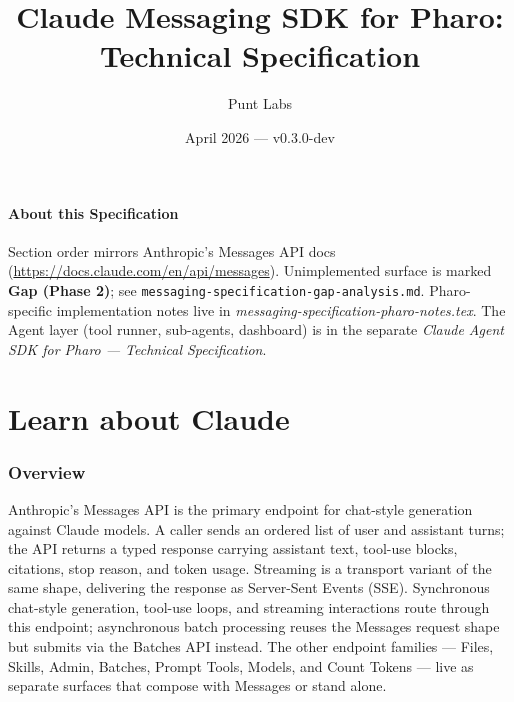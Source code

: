 \documentclass[a4paper,10pt,fleqn]{article}
\begin{document}
\title{Claude Messaging SDK for Pharo:\\Technical Specification}
\author{Punt Labs}
\date{April 2026 --- v0.3.0-dev}
\maketitle

\tableofcontents
\newpage

\subsection*{About this Specification}

Section order mirrors Anthropic's Messages API docs
(\url{https://docs.claude.com/en/api/messages}).  Unimplemented
surface is marked \textbf{Gap (Phase 2)}; see
\texttt{messaging-specification-gap-analysis.md}.  Pharo-specific
implementation notes live in
\emph{messaging-specification-pharo-notes.tex}.  The Agent layer
(tool runner, sub-agents, dashboard) is in the separate
\emph{Claude Agent SDK for Pharo --- Technical Specification}.


\part{Learn about Claude}

\section{Overview}
\label{sec:overview}

Anthropic's Messages API is the primary endpoint for chat-style
generation against Claude models.  A caller sends an ordered list
of user and assistant turns; the API returns a typed response
carrying assistant text, tool-use blocks, citations, stop reason,
and token usage.  Streaming is a transport variant of the same
shape, delivering the response as Server-Sent Events (SSE).
Synchronous chat-style generation, tool-use loops, and streaming
interactions route through this endpoint; asynchronous batch
processing reuses the Messages request shape but submits via the
Batches API instead.  The other endpoint families --- Files,
Skills, Admin, Batches, Prompt Tools, Models, and Count Tokens
--- live as separate surfaces that compose with Messages or
stand alone.
\end{document}
